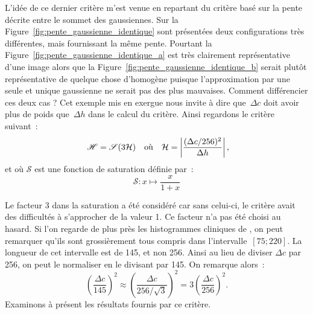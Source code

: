 \documentclass[main.tex]{subfiles}
\begin{document}
L'idée de ce dernier critère m'est venue %
en repartant du critère  %
basé sur la pente décrite entre le sommet des gaussiennes. Sur la Figure~\ref{fig:pente_gaussienne_identique} sont présentées deux configurations très différentes, mais fournissant la même pente. Pourtant la Figure~\ref{fig:pente_gaussienne_identique_a} est très clairement représentative d'une image \heterogene alors que la Figure~\ref{fig:pente_gaussienne_identique_b} serait plutôt représentative de quelque chose d'homogène puisque l'approximation par une seule et unique gaussienne ne serait pas des plus mauvaises. 
Comment différencier ces deux cas ? Cet exemple mis en exergue nous invite à dire que~$\Delta c$ doit avoir plus de poids que~$\Delta h$ dans le calcul du critère\HH. %
Ainsi regardons le critère suivant~:
\begin{equation}\label{eq:def_bon_critere}
~\mathscr{H} = \mathscr{S}(3\mathcal{H}) \quad \textrm{où} \quad \mathcal{H}=\left| \dfrac{(\Delta c /256)^2}{\Delta h} \right|,
\end{equation}
et où $\mathscr{S}$ est une fonction de saturation définie par~:
\begin{equation}
\mathscr{S} : x \mapsto \dfrac{x}{1+x}
\end{equation}

Le facteur 3 dans la saturation a été considéré car sans celui-ci, le critère avait des difficultés à s'approcher de la valeur 1. Ce facteur n'a pas été choisi au hasard. %
Si l'on regarde de plus près les histogrammes cliniques de \Nber, on peut remarquer qu'ils sont grossièrement tous compris dans l'intervalle~$[75;220]$. La longueur de cet intervalle est de 145, et non 256. Ainsi au lieu de diviser $\Delta c$ par 256, on peut le normaliser en le divisant par 145. On remarque alors~:
\begin{equation}
\left(\frac{\Delta c}{145}\right)^2 \approx \left(\frac{\Delta c}{256/\sqrt{3}}\right)^2 =  3 \left(\frac{\Delta c}{256}\right)^2.
\end{equation}
Examinons à présent les résultats fournis par ce critère.
\end{document}
